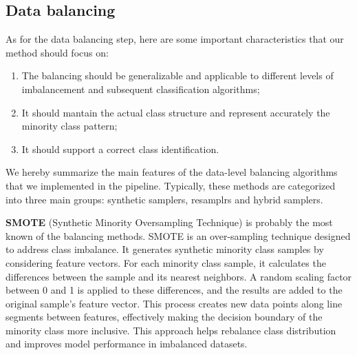 \subsection{Data balancing}
As for the data balancing step, here are some important characteristics that our method should focus on:
\begin{enumerate}[label=$\bullet$]
\item The balancing should be generalizable and applicable to different levels of imbalancement and subsequent classification algorithms;
\item It should mantain the actual class structure and represent accurately the minority class pattern;
\item It should support a correct class identification.
\end{enumerate}
   
We hereby summarize the main features of the data-level balancing algorithms that we implemented in the pipeline. Typically, these methods are categorized into three main groups: synthetic samplers, resamplrs and hybrid samplers.

\textbf{SMOTE} (Synthetic Minority Oversampling Technique) is probably the most known of the balancing methods. 
SMOTE is an over-sampling technique designed to address class imbalance. It generates synthetic minority class samples by considering feature vectors. For each minority class sample, it calculates the differences between the sample and its nearest neighbors. A random scaling factor between 0 and 1 is applied to these differences, and the results are added to the original sample's feature vector. This process creates new data points along line segments between features, effectively making the decision boundary of the minority class more inclusive. This approach helps rebalance class distribution and improves model performance in imbalanced datasets.
